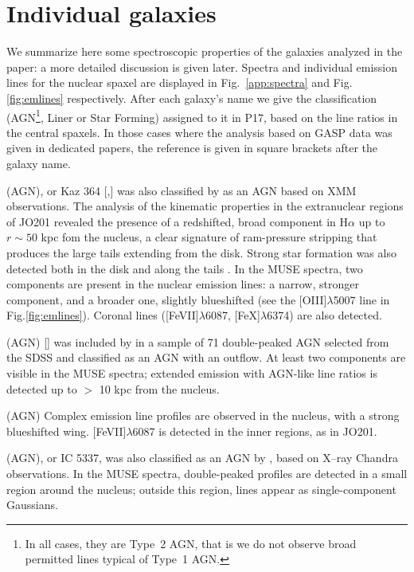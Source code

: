 \documentclass[fleqn,usenatbib]{mnras}
\begin{document}
\section{Individual galaxies}

We summarize here some spectroscopic properties of the galaxies analyzed in the paper: a more detailed discussion is given later. Spectra and individual emission lines for the nuclear spaxel are displayed in Fig.~\ref{app:spectra} and Fig.\ref{fig:emlines} respectively. After each galaxy's name we give the classification (AGN\footnote{In all cases, they are Type~2 AGN, that is we do not observe broad permitted lines typical of Type~1 AGN.}, Liner or Star Forming) assigned to it in P17, based on the line ratios in the central spaxels.  In those cases where the analysis based on GASP data was given in dedicated papers, the reference is given in square brackets after the galaxy name.  

 (AGN), or Kaz 364 [\citet{2017ApJ...844...49B},\citet{2018MNRAS.479.4126G}]
was also classified  by \citet{2009ApJ...707.1691A} as an AGN based on XMM observations.
The analysis of the kinematic properties in the extranuclear regions of JO201 \citep{2017ApJ...844...49B} revealed the presence of a redshifted, broad component in H$\alpha$  up to $r \sim 50$ kpc fom the nucleus, a clear signature of ram-pressure stripping that produces the large tails extending from the disk. Strong star formation was also detected  both in the disk and along the tails \citep{2018MNRAS.479.4126G}. 
In the MUSE spectra, two components are present in the nuclear emission lines: a narrow, stronger component, and a broader one, slightly blueshifted (see the [OIII]$\lambda$5007 line in Fig.\ref{fig:emlines}). Coronal lines ([FeVII]$\lambda$6087, [FeX]$\lambda$6374) are also detected.  


 (AGN) [\citet{2017ApJ...846...27G}] was included by \citet{2016ApJ...832...67N} in a sample of 71 double-peaked AGN selected from the SDSS and classified as an AGN with an outflow. At least two components are visible in the MUSE spectra; extended emission with AGN-like line ratios is detected up to $>$ 10 kpc from the nucleus.


 (AGN) Complex emission line profiles are observed in the nucleus, with a strong blueshifted wing. [FeVII]$\lambda$6087 is detected in the inner regions, as in JO201.


 (AGN), or IC 5337, was also classified as an AGN by \citet{2008ApJ...682..155W}, based on X--ray Chandra observations.  In the MUSE spectra,  double-peaked profiles are detected in a small region around the nucleus; outside this region, lines appear as single-component Gaussians.
\end{document}
